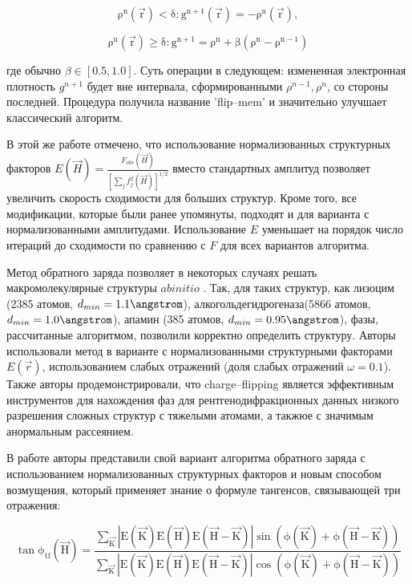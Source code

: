 \begin{equation}
	\mathrm{\rho^n(\overrightarrow{r}) < \delta: g^{n+1}(\overrightarrow{r}) = -\rho^n(\overrightarrow{r})},
\end{equation}
 
 
\begin{equation}
	\mathrm{\rho^n(\overrightarrow{r}) \geq \delta: g^{n+1} = \rho^n + \beta(\rho^n-\rho^{n-1})}
\end{equation} 
  
где обычно $\beta\in[0.5,1.0]$. Суть операции в следующем: измененная электронная плотность $g^{n+1}$ будет вне интервала, сформированными $\rho^{n-1}, \rho^{n}$, со стороны последней. Процедура получила название 'flip--mem' и значительно улучшает классический алгоритм.

В этой же работе отмечено, что использование нормализованных структурных факторов $E(\overrightarrow{H}) = \frac{F_{obs}(\overrightarrow{H})}{[\sum_j f_j^2(\overrightarrow{H})]^{1/2}}$ вместо стандартных амплитуд позволяет увеличить скорость сходимости для больших структур. Кроме того, все модификации, которые были ранее упомянуты, подходят и для варианта с нормализованными амплитудами. Использование $E$ уменьшает на порядок число итераций до сходимости по сравнению с $F$ для всех вариантов алгоритма.

Метод обратного заряда позволяет в некоторых случаях решать макромолекулярные структуры $ab initio$ \cite{dumas_macromolecular_2008}. Так, для таких структур, как лизоцим (2385 атомов, $d_{min} = 1.1\angstrom$), алкогольдегидрогеназа(5866 атомов, $d_{min} = 1.0\angstrom$), апамин (385 атомов, $d_{min} = 0.95\angstrom$), фазы, рассчитанные алгоритмом, позволили корректно определить структуру. Авторы использовали метод в варианте с нормализованными структурными факторами $E(\overrightarrow{r})$, использованием слабых отражений (доля слабых отражений $\omega = 0.1$). Также авторы продемонстрировали, что charge--flipping является эффективным инструментов для нахождения фаз для рентгенодифракционных данных низкого разрешения сложных структур с тяжелыми атомами, а такжюе с значимым анормальным рассеянием.

В работе \cite{coelho_charge-flipping_2007} авторы представили свой вариант алгоритма обратного заряда с использованием нормализованных структурных факторов и новым способом возмущения, который применяет знание о формуле тангенсов, связывающей три отражения:

\begin{equation}\label{sigma3}
	\mathrm{\tan\phi_{tf}(\overrightarrow{H}) = \frac{\sum\limits_{\overrightarrow{K}}|E(\overrightarrow{K})E(\overrightarrow{H})E(\overrightarrow{H}-\overrightarrow{K})|\sin(\phi(\overrightarrow{K})+\phi(\overrightarrow{H}-\overrightarrow{K}))}{\sum\limits_{\overrightarrow{K}}|E(\overrightarrow{K})E(\overrightarrow{H})E(\overrightarrow{H}-\overrightarrow{K})|\cos(\phi(\overrightarrow{K})+\phi(\overrightarrow{H}-\overrightarrow{K}))}
	}
\end{equation}

